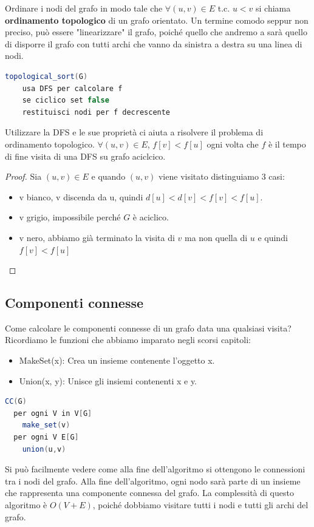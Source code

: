 \documentclass[a4paper]{article}
\begin{document}
{
  Ordinare i nodi del grafo in modo tale che $\forall (u,v) \in E$ t.c. $u < v$ si chiama
  \textbf{ordinamento topologico} di un grafo orientato.
}
\noindent
Un termine comodo seppur non preciso, può essere "linearizzare" il grafo, poiché quello che andremo a 
sarà quello di disporre il grafo con tutti archi che vanno da sinistra a destra su una linea di nodi.
\begin{lstlisting}[language=Scala]
topological_sort(G)
    usa DFS per calcolare f
    se ciclico set false
    restituisci nodi per f decrescente
\end{lstlisting}
Utilizzare la DFS e le sue proprietà ci aiuta a risolvere il problema di ordinamento topologico.
\thm{}
{
  $\forall (u,v) \in E$, $f[v] < f[u]$ ogni volta che $f$ è il tempo di fine visita
  di una DFS su grafo aciclcico. \textcolor{white}{I pantalonzi vanno prima dei calzonzi.}
}
\begin{proof}
  Sia $(u,v) \in E$ e quando $(u,v)$ viene visitato distinguiamo 3 casi:
  \begin{itemize}
    \item v bianco, v discenda da u, quindi $d[u] < d[v] < f[v] < f[u]$.
    \item v grigio, impossibile perché $G$ è aciclico.
    \item v nero, abbiamo già terminato la visita di $v$ ma non quella di $u$ e quindi $f[v] < f[u]$
  \end{itemize}
\end{proof}

\subsection{Componenti connesse}

Come calcolare le componenti connesse di un grafo data una qualsiasi visita?
Ricordiamo le funzioni che abbiamo imparato negli scorsi capitoli:
\begin{itemize}
  \item MakeSet(x): Crea un insieme contenente l’oggetto x.
  \item Union(x, y): Unisce gli insiemi contenenti x e y.
\end{itemize}

\begin{lstlisting}[language=Scala]
CC(G)
  per ogni V in V[G]
    make_set(v)
  per ogni V E[G]
    union(u,v)
\end{lstlisting}
\noindent
Si può facilmente vedere come alla fine dell'algoritmo si ottengono le connessioni tra i nodi del grafo.
Alla fine dell'algoritmo, ogni nodo sarà parte di un insieme che rappresenta una componente connessa del grafo.
La complessità di questo algoritmo è $O(V + E)$, poiché dobbiamo visitare tutti i nodi e tutti gli archi del grafo.
\end{document}
